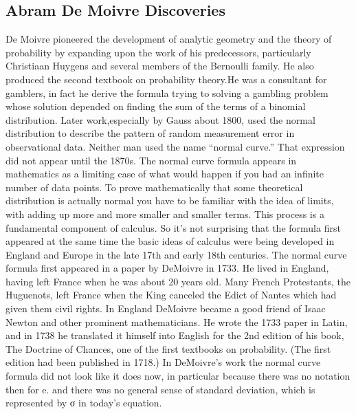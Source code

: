 \documentclass{article}
\begin{document}
\subsection{Abram De Moivre Discoveries}
De Moivre pioneered the development of analytic geometry and the theory of probability by expanding upon the work of his predecessors, particularly Christiaan Huygens and several members of the Bernoulli family. He also produced the second textbook on probability theory.He was a consultant for  gamblers, in fact he derive the formula trying to  solving a gambling
problem whose solution depended on finding the sum of the terms of a binomial distribution. Later work,especially by Gauss about 1800, used the normal distribution to describe the pattern of random
measurement error in observational data. Neither man used the name “normal curve.” That expression did not appear until the 1870s.
The normal curve formula appears in mathematics as a limiting case of what would happen if you had an
infinite number of data points. To prove mathematically that some theoretical distribution is actually
normal you have to be familiar with the idea of limits, with adding up more and more smaller and smaller
terms. This process is a fundamental component of calculus. So it’s not surprising that the formula first
appeared at the same time the basic ideas of calculus were being developed in England and Europe in the
late 17th and early 18th centuries.
The normal curve formula first appeared in a paper by DeMoivre in 1733. He lived in
England, having left France when he was about 20 years old. Many French
Protestants, the Huguenots, left France when the King canceled the Edict of Nantes
which had given them civil rights. In England DeMoivre became a good friend of
Isaac Newton and other prominent mathematicians.
He wrote the 1733 paper in Latin, and in 1738 he translated it himself into English for
the 2nd edition of his book, The Doctrine of Chances, one of the first textbooks on
probability. (The first edition had been published in 1718.)
In DeMoivre’s work the normal curve formula did not look like it does now, in particular because there
was no notation then for e. and there was no general sense of standard deviation, which is represented by σ in today’s equation.
\end{document}
